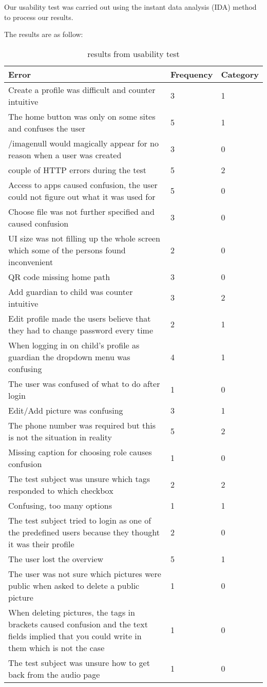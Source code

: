 Our usability test was carried out using the instant data analysis (IDA) method to process our results.

The results are as follow:

\begin{table}
	\centering
	\begin{tabular}{|p{7cm}|l|l|}
		\hline
		Error & Frequency & Category \\
		\hline
		\hline
		Create a profile was difficult and counter intuitive & 3 & 1 \\ \hline
		The home button was only on some sites and confuses the user & 5 & 1 \\ \hline
		/imagenull would magically appear for no reason when a user was created & 3 & 0 \\ \hline
		couple of HTTP errors during the test & 5 & 2 \\ \hline
		Access to apps caused confusion, the user could not figure out what it was used for & 5 & 0 \\ \hline
		Choose file was not further specified and caused confusion & 3 & 0 \\ \hline
		UI size was not filling up the whole screen which some of the persons found inconvenient & 2 & 0 \\ \hline
		QR code missing home path & 3 & 0 \\ \hline
		Add guardian to child was counter intuitive & 3 & 2 \\ \hline
		Edit profile made the users believe that they had to change password every time & 2 & 1 \\ \hline
		When logging in on child's profile as guardian the dropdown menu was confusing & 4 & 1 \\ \hline
		The user was confused of what to do after login & 1 & 0 \\ \hline
		Edit/Add picture was confusing & 3 & 1 \\ \hline
		The phone number was required but this is not the situation in reality & 5 & 2 \\ \hline
		Missing caption for choosing role causes confusion & 1 & 0 \\ \hline
		The test subject was unsure which tags responded to which checkbox & 2 & 2 \\ \hline
		Confusing, too many options & 1 & 1 \\ \hline
		The test subject tried to login as one of the predefined users because they thought it was their profile & 2 & 0 \\ \hline
		The user lost the overview & 5 & 1 \\ \hline
		The user was not sure which pictures were public when asked to delete a public picture & 1 & 0 \\ \hline
		When deleting pictures, the tags in brackets caused confusion and the text fields implied that you could write in them which is not the case & 1 & 0 \\ \hline
		The test subject was unsure how to get back from the audio page & 1 & 0 \\
		\hline
	\end{tabular}
	\caption{results from usability test}
	\label{tab:results}
\end{table}


